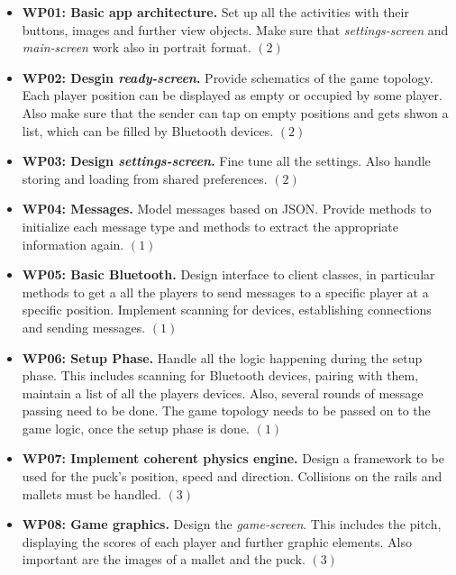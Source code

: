 \documentclass{report}
\begin{document}
\begin{itemize}
        \item {\bf WP01:  Basic app architecture.} Set up all the activities with their buttons, images and further view objects. Make sure that \textit{settings-screen} and \textit{main-screen} work also in portrait format. $(2)$
        
        \item {\bf WP02: Desgin \textit{ready-screen}.} Provide schematics of the game topology. Each player position can be displayed as empty or occupied by some player. Also make sure that the sender can tap on empty positions and gets shwon a list, which can be filled by Bluetooth devices. $(2)$
        
        \item {\bf WP03: Design \textit{settings-screen}.} Fine tune all the settings. Also handle storing and loading from shared preferences. $(2)$
        
        \item {\bf WP04: Messages.} Model messages based on JSON. Provide methods to initialize each message type and methods to extract the appropriate information again. $(1)$
        
        \item {\bf WP05: Basic Bluetooth.} Design interface to client classes, in particular methods to get a all the players to send messages to a specific player at a specific position. Implement scanning for devices, establishing connections and sending messages. $(1)$
        
        \item {\bf WP06: Setup Phase.} Handle all the logic happening during the setup phase. This includes scanning for Bluetooth devices, pairing with them, maintain a list of all the players devices. Also, several rounds of message passing need to be done. The game topology needs to be passed on to the game logic, once the setup phase is done. $(1)$
        
         \item {\bf WP07: Implement coherent physics engine.} Design a framework to be used for the puck's position, speed and direction. Collisions on the rails and mallets must be handled. $(3)$
         
        	\item {\bf WP08: Game graphics.} Design the \textit{game-screen}. This includes the pitch, displaying the scores of each player and further graphic elements. Also important are the images of a mallet and the puck. $(3)$
	

\end{itemize}
\end{document}

